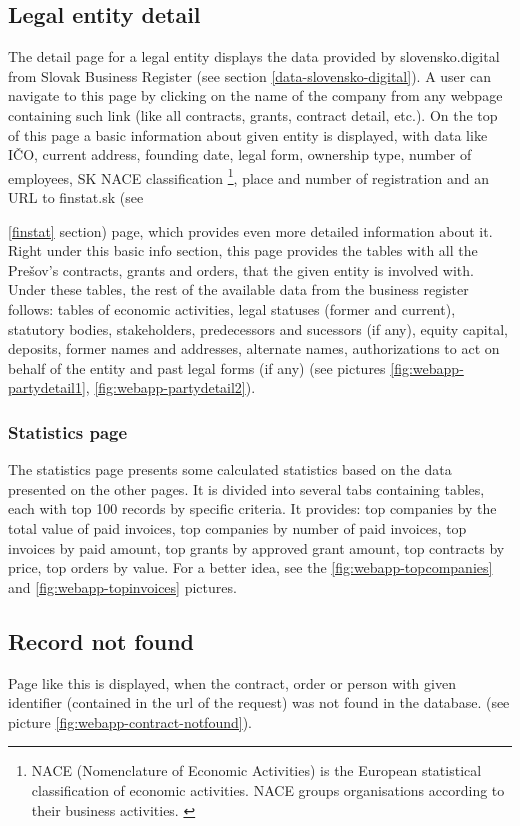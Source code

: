 \documentclass[thesis=B,english]{FITthesis}[2012/06/26]
\begin{document}
\subsection{Legal entity detail}
	The detail page for a legal entity displays the data provided by slovensko.digital from Slovak Business Register (see section \ref{data-slovensko-digital}). A user can navigate to this page by clicking on the name of the company from any webpage containing such link (like all contracts, grants, contract detail, etc.). On the top of this page a basic information about given entity is displayed, with data like IČO, current address, founding date, legal form, ownership type, number of employees, SK NACE classification \footnote{NACE (Nomenclature of Economic Activities) is the European statistical classification of economic activities. NACE groups organisations according to their business activities. \cite{nace}}, place and number of registration and an URL to finstat.sk (see {\ref{finstat} section) page, which provides even more detailed information about it. Right under this basic info section, this page provides the tables with all the Prešov's contracts, grants and orders, that the given entity is involved with. Under these tables, the rest of the available data from the business register follows: tables of economic activities, legal statuses (former and current), statutory bodies, stakeholders,  predecessors and sucessors (if any), equity capital, deposits, former names and addresses, alternate names, authorizations to act on behalf of the entity and past legal forms (if any) (see pictures \ref{fig:webapp-partydetail1}, \ref{fig:webapp-partydetail2}).


\subsubsection{Statistics page}
	The statistics page presents some calculated statistics based on the data presented on the other pages. It is divided into several tabs containing tables, each with top 100 records by specific criteria. It provides: top companies by the total value of paid invoices, top companies by number of paid invoices, top invoices by paid amount, top grants by approved grant amount, top contracts by price, top orders by value. For a better idea, see the \ref{fig:webapp-topcompanies} and \ref{fig:webapp-topinvoices} pictures.

\subsection{Record not found}
	Page like this is displayed, when the contract, order or person with given identifier (contained in the url of the request) was not found in the database. (see picture \ref{fig:webapp-contract-notfound}).
	
}
\end{document}

